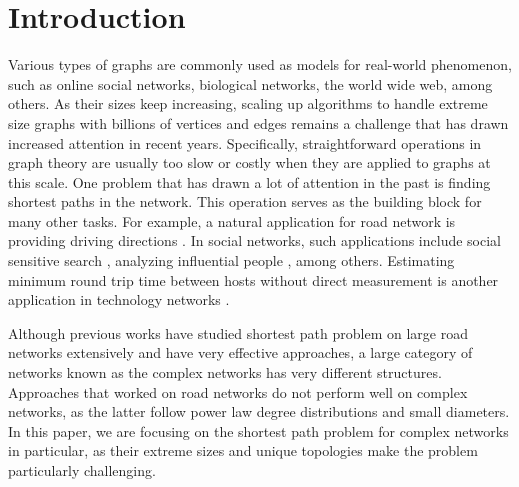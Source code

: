 \section{Introduction}
\label{introduction}

Various types of graphs are commonly used as models for real-world phenomenon, such as online social networks, biological networks, the world wide web, among others. As their sizes keep increasing, scaling up algorithms to handle extreme size graphs with billions of vertices and edges remains a challenge that has drawn increased attention in recent years. Specifically, straightforward operations in graph theory are usually too slow or costly when they are applied to graphs at this scale. One problem that has drawn a lot of attention in the past is finding shortest paths in the network. This operation serves as the building block for many other tasks. For example, a natural application for road network is providing driving directions \cite{Abraham:2011:HLA:2008623.2008645}. In social networks, such applications include social sensitive search \cite{Vieira:2007:ESR:1321440.1321520}, analyzing influential people \cite{Kempe:2003:MSI:956750.956769}, among others. Estimating minimum round trip time between hosts without direct measurement is another application in technology networks \cite{Tang:2003:VLI:948205.948223}.

Although previous works have studied shortest path problem on large road networks extensively and have very effective approaches, a large category of networks known as the complex networks has very different structures. Approaches that worked on road networks do not perform well on complex networks, as the latter follow power law degree distributions and small diameters. In this paper, we are focusing on the shortest path problem for complex networks in particular, as their extreme sizes and unique topologies make the problem particularly challenging.

